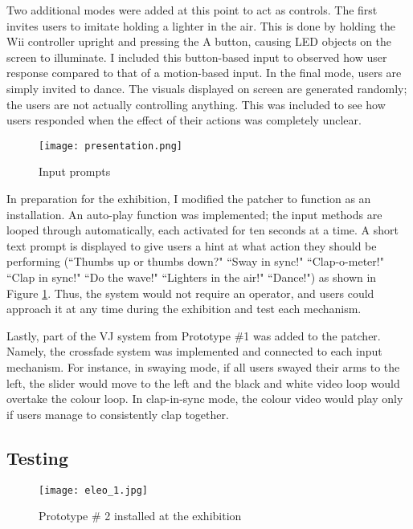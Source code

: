 Two additional modes were added at this point to act as controls. The first invites users to imitate holding a lighter in the air. This is done by holding the Wii controller upright and pressing the A button, causing LED objects on the screen to illuminate. I included this button-based input to observed how user response compared to that of a motion-based input. In the final mode, users are simply invited to dance. The visuals displayed on screen are generated randomly; the users are not actually controlling anything. This was included to see how users responded when the effect of their actions was completely unclear.

\begin{figure}
	\centering

	\texttt{[image: presentation.png]}
	\caption{Input prompts}

	\label{prototyping2.3}
\end{figure}

In preparation for the exhibition, I modified the patcher to function as an installation. An auto-play function was implemented; the input methods are looped through automatically, each activated for ten seconds at a time. A short text prompt is displayed to give users a hint at what action they should be performing (``Thumbs up or thumbs down?" ``Sway in sync!" ``Clap-o-meter!" ``Clap in sync!" ``Do the wave!" ``Lighters in the air!" ``Dance!") as shown in Figure \ref{prototyping2.3}. Thus, the system would not require an operator, and users could approach it at any time during the exhibition and test each mechanism.

Lastly, part of the VJ system from Prototype \#1 was added to the patcher. Namely, the crossfade system was implemented and connected to each input mechanism. For instance, in swaying mode, if all users swayed their arms to the left, the slider would move to the left and the black and white video loop would overtake the colour loop. In clap-in-sync mode, the colour video would play only if users manage to consistently clap together.

\subsection{Testing}

\begin{figure}
	\centering

	\texttt{[image: eleo\_1.jpg]}
	\caption{Prototype \# 2 installed at the exhibition}

	\label{prototyping2.4}
\end{figure}

